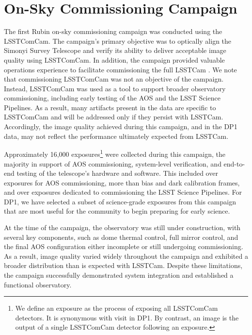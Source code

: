 \section{On-Sky Commissioning Campaign \label{sec:on_sky_campaign}}

The first Rubin on-sky commissioning campaign was conducted using the \gls{LSSTComCam}. The campaign's primary objective was to optically align the Simonyi Survey Telescope and verify its ability to deliver acceptable image quality using \gls{LSSTComCam}.
In addition, the campaign provided valuable operations experience to facilitate commissioning the full \gls{LSSTCam} \citep{2024SPIE13096E..1OL,2024SPIE13096E..1SR}.
We note that commissioning \gls{LSSTComCam} was not an objective of the campaign.
Instead, LSSTComCam was used as a tool to support broader observatory commissioning, including early testing of the \gls{AOS} and the LSST Science Pipelines.
As a result,
many artifacts present in the data are specific to \gls{LSSTComCam} and will be addressed only if they persist with \gls{LSSTCam}.
Accordingly, the image quality achieved during this campaign, and in the \gls{DP1} data, may not reflect the performance ultimately expected from \gls{LSSTCam}.

Approximately 16,000 exposures\footnote{We define an exposure as the process of exposing all LSSTComCam detectors. It is synonymous with visit in DP1. By contrast, an image is the output of a single LSSTComCam detector following an exposure.} 
were collected during this campaign, the majority in support of \gls{AOS} commissioning, system-level verification, and end-to-end testing of the telescope’s hardware and software.
This included over \nexposuresaoscommissioning exposures for \gls{AOS} commissioning, more than \nexposurescalibcommissioning bias and dark calibration frames, and over \nexposuresspcommissioning exposures dedicated to commissioning the LSST Science Pipelines.
For \gls{DP1}, we have selected a subset of \nexposures science-grade exposures from this campaign that are most useful for the community to begin preparing for early science.

At the time of the campaign, the observatory was still under construction, with several key components, such as dome thermal control, full mirror control, and the final \gls{AOS} configuration either incomplete or still undergoing commissioning.
As a result, image quality varied widely throughout the campaign and exhibited a broader distribution than is expected with \gls{LSSTCam}.
Despite these limitations, the campaign successfully demonstrated system integration and established a functional observatory.

